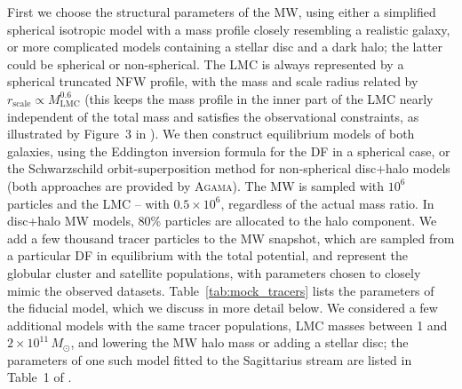 \documentclass[usenatbib,fleqn]{mnras}
\begin{document}
First we choose the structural parameters of the MW, using either a simplified spherical isotropic model with a mass profile closely resembling a realistic galaxy, or more complicated models containing a stellar disc and a dark halo; the latter could be spherical or non-spherical. The LMC is always represented by a spherical truncated NFW profile, with the mass and scale radius related by $r_\text{scale}\propto M_\text{LMC}^{0.6}$ (this keeps the mass profile in the inner part of the LMC nearly independent of the total mass and satisfies the observational constraints, as illustrated by Figure~3 in \citealt{Vasiliev2021b}). We then construct equilibrium models of both galaxies, using the Eddington inversion formula for the DF in a spherical case, or the Schwarzschild orbit-superposition method for non-spherical disc+halo models (both approaches are provided by \textsc{Agama}). The MW is sampled with $10^6$ particles and the LMC -- with $0.5\times10^6$, regardless of the actual mass ratio. In disc+halo MW models, 80\% particles are allocated to the halo component. We add a few thousand tracer particles to the MW snapshot, which are sampled from a particular DF in equilibrium with the total potential, and represent the globular cluster and satellite populations, with parameters chosen to closely mimic the observed datasets. Table~\ref{tab:mock_tracers} lists the parameters of the fiducial model, which we discuss in more detail below. We considered a few additional models with the same tracer populations, LMC masses between 1 and $2\times10^{11}\,M_\odot$, and lowering the MW halo mass or adding a stellar disc; the parameters of one such model fitted to the Sagittarius stream are listed in Table~1 of \citet{Vasiliev2021b}.
\end{document}
